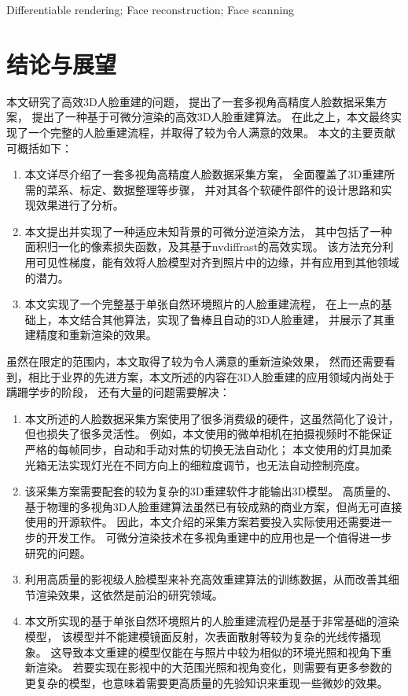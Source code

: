 \documentclass{scutmaster}
\begin{document}
 Differentiable rendering; Face reconstruction; Face scanning

\tableofcontents

\listoffigures

\listoftables

\mainmatter










\chapter{结论与展望}
\label{chap:conclusion}

本文研究了高效3D人脸重建的问题，
提出了一套多视角高精度人脸数据采集方案，
提出了一种基于可微分渲染的高效3D人脸重建算法。
在此之上，本文最终实现了一个完整的人脸重建流程，并取得了较为令人满意的效果。
本文的主要贡献可概括如下：
\begin{enumerate}
\item 本文详尽介绍了一套多视角高精度人脸数据采集方案，
全面覆盖了3D重建所需的菜系、标定、数据整理等步骤，
并对其各个软硬件部件的设计思路和实现效果进行了分析。
\item 本文提出并实现了一种适应未知背景的可微分逆渲染方法，
其中包括了一种面积归一化的像素损失函数，及其基于nvdiffrast的高效实现。
该方法充分利用可见性梯度，能有效将人脸模型对齐到照片中的边缘，并有应用到其他领域的潜力。
\item 本文实现了一个完整基于单张自然环境照片的人脸重建流程，
在上一点的基础上，本文结合其他算法，实现了鲁棒且自动的3D人脸重建，
并展示了其重建精度和重新渲染的效果。
\end{enumerate}

虽然在限定的范围内，本文取得了较为令人满意的重新渲染效果，
然而还需要看到，相比于业界的先进方案，本文所述的内容在3D人脸重建的应用领域内尚处于蹒跚学步的阶段，
还有大量的问题需要解决：
\begin{enumerate}
\item 本文所述的人脸数据采集方案使用了很多消费级的硬件，这虽然简化了设计，但也损失了很多灵活性。
例如，本文使用的微单相机在拍摄视频时不能保证严格的每帧同步，自动和手动对焦的切换无法自动化；
本文使用的灯具加柔光箱无法实现灯光在不同方向上的细粒度调节，也无法自动控制亮度。
\item 该采集方案需要配套的较为复杂的3D重建软件才能输出3D模型。
高质量的、基于物理的多视角3D人脸重建算法虽然已有较成熟的商业方案，但尚无可直接使用的开源软件。
因此，本文介绍的采集方案若要投入实际使用还需要进一步的开发工作。
可微分渲染技术在多视角重建中的应用也是一个值得进一步研究的问题。
\item 利用高质量的影视级人脸模型来补充高效重建算法的训练数据，从而改善其细节渲染效果，这依然是前沿的研究领域。
\item 本文所实现的基于单张自然环境照片的人脸重建流程仍是基于非常基础的渲染模型，
该模型并不能建模镜面反射，次表面散射等较为复杂的光线传播现象。
这导致本文重建的模型仅能在与照片中较为相似的环境光照和视角下重新渲染。
若要实现在影视中的大范围光照和视角变化，则需要有更多参数的更复杂的模型，也意味着需要更高质量的先验知识来重现一些微妙的效果。
\end{enumerate}
\end{document}
